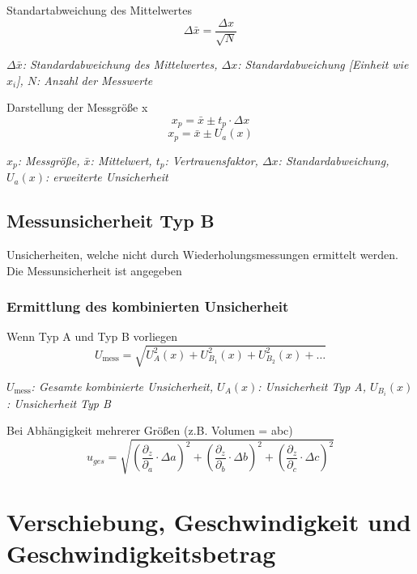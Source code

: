\documentclass[a4paper,10pt]{article}
\newenvironment{displayformula}
{
	\begin{framed}
		\color{formulaColor}
	}
	{\end{framed}}
\newcommand{\formulalegend}[1]{%
	\par\vspace{0.5ex}%
	{{\color{legendColor}\RaggedRight\small\textit{#1}}}%
	\par\vspace{1.5ex}%
}
\begin{document}
	\begin{displayformula}
		Standartabweichung des Mittelwertes
		\[
		\Delta \bar{x} = \frac{\Delta x}{\sqrt{N}} 
		\]	
	\end{displayformula}
	\formulalegend{
		\( \Delta \bar{x} \): Standardabweichung des Mittelwertes, \( \Delta x \): Standardabweichung [Einheit wie \( x_i \)], \( N \): Anzahl der Messwerte
	}
	
	\begin{displayformula}
		Darstellung der Messgröße x
		\[
		x_p = \bar{x} \pm t_p \cdot \Delta x
		\]
		\[
		x_p = \bar{x} \pm U_a (x)
		\]
	\end{displayformula}
	\formulalegend{
		\( x_p \): Messgröße, \( \bar{x} \): Mittelwert, \( t_p \): Vertrauensfaktor, \( \Delta x \): Standardabweichung, \( U_a(x) \): erweiterte Unsicherheit
	}
	
	\subsection{Messunsicherheit Typ B}
	\begin{displayformula}
		Unsicherheiten, welche nicht durch Wiederholungsmessungen ermittelt werden. \\ Die Messunsicherheit ist angegeben
	\end{displayformula}
	
	\subsubsection{Ermittlung des kombinierten Unsicherheit}
	
	\begin{displayformula}
		Wenn Typ A und Typ B vorliegen
		\[
		U_\text{mess} = \sqrt{U^2_A(x) + U^2_{B_1}(x) + U^2_{B_2}(x) + \dots}
		\]
	\end{displayformula}
	\formulalegend{
		\( U_\text{mess} \): Gesamte kombinierte Unsicherheit, \( U_A(x) \): Unsicherheit Typ A, \( U_{B_i}(x) \): Unsicherheit Typ B
	}
	
	\begin{displayformula}
		Bei Abhängigkeit mehrerer Größen (z.B. Volumen = abc)
		\[
		u_{ges} = \sqrt{(\frac{\partial_z}{\partial_a} \cdot \Delta a)^2 + (\frac{\partial_z}{\partial_b} \cdot \Delta b)^2 + (\frac{\partial_z}{\partial_c} \cdot \Delta c)^2 }
		\]
	\end{displayformula}
	
	
\section{Verschiebung, Geschwindigkeit und \\Geschwindigkeitsbetrag}
\end{document}
